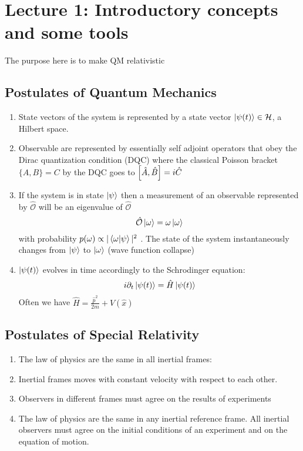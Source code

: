 \section{Lecture 1: Introductory concepts and some tools}  
The purpose here is to make QM relativistic

\subsection{Postulates of Quantum Mechanics}
\begin{enumerate}
    \item State vectors of the system is represented by a state vector $\ket{\psi(t)} \in \mathcal{H}$, a Hilbert space.
    \item Observable are represented by essentially self adjoint operators that obey the Dirac quantization condition (DQC) where the classical Poisson bracket $\{ A, B \} = C$ by the DQC goes to $\comm{\hat{A}}{\hat{B}} = i\hat{C}$
    \item If the system is in state $\ket{\psi}$ then a measurement of an observable represented by $\hat{\mathcal{O}}$ will be an eigenvalue of $\hat{\mathcal{O}}$
\begin{equation}
    \hat{\mathcal{O}}\ket{\omega} = \omega \ket{\omega} 
\end{equation}
with probability $p(\omega) \propto |\expval{\omega|\psi}|^2$ . The state of the system instantaneously changes from $\ket{\psi}$ to $\ket{\omega}$ (wave function collapse)

\item $\ket{\psi(t)}$ evolves in time accordingly to the Schrodinger equation:
\begin{equation}
    i\partial_t \ket{\psi(t)} = \hat{H} \ket{\psi(t)}
\end{equation}
Often we have $\hat{H} = \frac{\hat{p}^2}{2m} + V(\hat{x})$

\end{enumerate}

\subsection{Postulates of Special Relativity}
\begin{enumerate}
    \item The law of physics are the same in all inertial frames:
   \item Inertial frames moves with constant velocity with respect to each other.
   \item Observers in different frames must agree on the results of experiments
   \item The law of physics are the same in any inertial reference frame. All inertial observers must agree on the initial conditions of an experiment and on the equation of motion. 
\end{enumerate}

